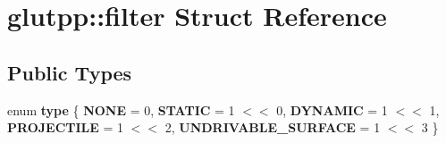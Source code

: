 \hypertarget{structglutpp_1_1filter}{\section{glutpp\-:\-:filter \-Struct \-Reference}
\label{structglutpp_1_1filter}
}
\subsection*{\-Public \-Types}
\begin{DoxyCompactItemize}
\item 
enum {\bfseries type} \{ \*
{\bfseries \-N\-O\-N\-E} =  0, 
{\bfseries \-S\-T\-A\-T\-I\-C} =  1 $<$$<$ 0, 
{\bfseries \-D\-Y\-N\-A\-M\-I\-C} =  1 $<$$<$ 1, 
{\bfseries \-P\-R\-O\-J\-E\-C\-T\-I\-L\-E} =  1 $<$$<$ 2, 
\*
{\bfseries \-U\-N\-D\-R\-I\-V\-A\-B\-L\-E\-\_\-\-S\-U\-R\-F\-A\-C\-E} =  1 $<$$<$ 3
 \}
\end{DoxyCompactItemize}
